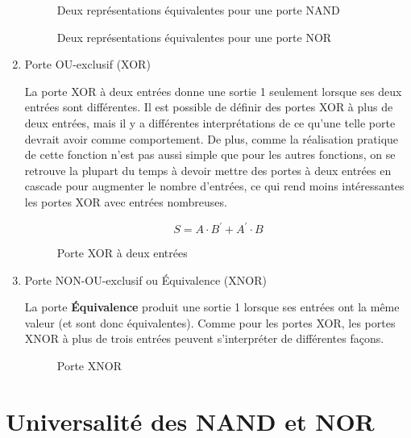 \documentclass[letter, oneside]{book}
\begin{document}
\begin{enumerate}
\begin{figure}[htbp]
\centering

\caption{\label{fig:org8aa24a7}Deux représentations équivalentes pour une porte NAND}
\end{figure}

\begin{figure}[htbp]
\centering

\caption{\label{fig:orgcdad62b}Deux représentations équivalentes pour une porte NOR}
\end{figure}

\item Porte OU-exclusif (XOR)
\label{sec:orgac3eec1}

La porte XOR à deux entrées donne une sortie 1 seulement lorsque ses
deux entrées sont différentes. Il est possible de définir des portes
XOR à plus de deux entrées, mais il y a différentes interprétations de
ce qu'une telle porte devrait avoir comme comportement. De plus, comme
la réalisation pratique de cette fonction n'est pas aussi simple que
pour les autres fonctions, on se retrouve la plupart du temps à devoir
mettre des portes à deux entrées en cascade pour augmenter le nombre
d'entrées, ce qui rend moins intéressantes les portes XOR avec entrées
nombreuses.

$$S= A \cdot B^\prime + A^\prime \cdot B$$

\begin{figure}[htbp]
\centering

\caption{\label{fig:org055480e}Porte XOR à deux entrées}
\end{figure}

\item Porte NON-OU-exclusif ou Équivalence (XNOR)
\label{sec:orgb800d2f}

La porte \textbf{Équivalence} produit une sortie 1 lorsque ses entrées ont la
même valeur (et sont donc équivalentes). Comme pour les portes XOR,
les portes XNOR à plus de trois entrées peuvent s'interpréter de
différentes façons.

\begin{figure}[htbp]
\centering

\caption{\label{fig:orgf53bde8}Porte XNOR}
\end{figure}
\end{enumerate}

\section{Universalité des NAND et NOR}
\label{sec:orge047ee6}
\end{document}
